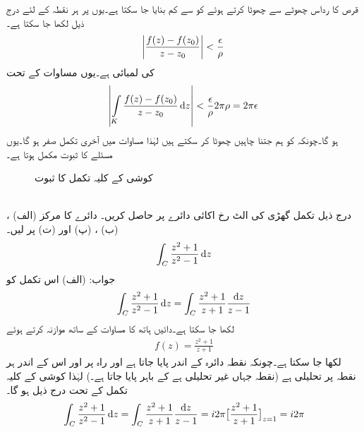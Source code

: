 قرص کا رداس  چھوٹے سے چھوٹا کرتے ہوئے  کو  سے کم بنایا جا سکتا ہے۔یوں  پر ہر نقطہ کے لئے درج ذیل لکھا جا سکتا ہے۔
\begin{align*}
\abs{\frac{f(z)-f(z_0)}{z-z_0}}<\frac{\epsilon}{\rho}
\end{align*}
 کی لمبائی  ہے۔یوں مساوات  کے تحت 
\begin{align*}
\abs{\int\limits_K \frac{f(z)-f(z_0)}{z-z_0}\dif z}<\frac{\epsilon}{\rho}2\pi\rho=2\pi\epsilon
\end{align*}
ہو گا۔چونکہ  کو ہم جتنا چاہیں چھوٹا کر سکتے ہیں لہٰذا مساوات  میں آخری تکمل صفر ہو گا۔یوں مسئلے کا ثبوت مکمل ہوتا ہے۔
%
\begin{figure}
\centering
{}
\caption{کوشی کے کلیہ تکمل کا ثبوت}
\label{شکل_مخلوط_تکمل_کوشی_کلیہ_ثبوت}
\end{figure}
\quad {}\\
درج ذیل تکمل گھڑی کی الٹ رخ اکائی دائرے پر حاصل کریں۔ دائرے کا مرکز (الف) ، (ب) ، (پ)  اور (ت)  پر لیں۔
\begin{align*}
\int_C\frac{z^2+1}{z^2-1}\dif z
\end{align*}
جواب:\quad
(الف) \quad  اس تکمل کو
\begin{align*}
\int_C\frac{z^2+1}{z^2-1}\dif z=\int_C \frac{z^2+1}{z+1}\frac{\dif z}{z-1}
\end{align*}
لکھا جا سکتا ہے۔دائیں ہاتھ کا مساوات  کے ساتھ موازنہ کرتے ہوئے
\begin{align*}
f(z)=\frac{z^2+1}{z+1}
\end{align*}
 لکھا جا سکتا ہے۔چونکہ نقطہ  دائرہ  کے اندر پایا جاتا ہے اور  راہ  پر اور اس کے اندر ہر نقطہ پر تحلیلی ہے (نقطہ  جہاں  غیر تحلیلی ہے  کے باہر پایا جاتا ہے۔) لہٰذا کوشی کے کلیہ تکمل کے تحت درج ذیل ہو گا۔
\begin{align*}
\int_C \frac{z^2+1}{z^2-1}\dif z=\int_C \frac{z^2+1}{z+1}\frac{\dif z}{z-1}=i2\pi\big[\frac{z^2+1}{z+1}\big]_{z=1}=i2\pi
\end{align*}
